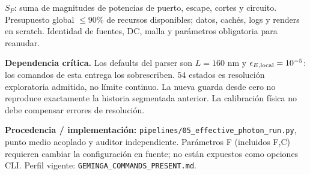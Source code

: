 \documentclass[11pt,a4paper]{article}
\newcommand{\origin}[1]{\par{\footnotesize\raggedright\color{ink}\textbf{Procedencia / implementación:} #1\par}}
\newcommand{\critical}[1]{\par{\small\raggedright\textbf{\color{accent}Dependencia crítica.} #1\par}}
\begin{document}
{\small $S_P$: suma de magnitudes de potencias de puerto, escape, cortes y circuito.
Presupuesto global $\le90\%$ de recursos disponibles; datos, cachés, logs y renders en scratch.
Identidad de fuentes, DC, malla y parámetros obligatoria para reanudar.}
\critical{Los defaults del parser son $L=160$ nm y $\epsilon_{E,\rm local}=10^{-5}$: los comandos de esta entrega los sobrescriben. $54$ estados es resolución exploratoria admitida, no límite continuo. La nueva guarda desde cero no reproduce exactamente la historia segmentada anterior. La calibración física no debe compensar errores de resolución.}
\vfill
\origin{\texttt{pipelines/05\_effective\_photon\_run.py}, punto medio acoplado y auditor independiente. Parámetros F (incluidos F,C) requieren cambiar la configuración en fuente; no están expuestos como opciones CLI. Perfil vigente: \texttt{GEMINGA\_COMMANDS\_PRESENT.md}.}
\newpage
\end{document}

